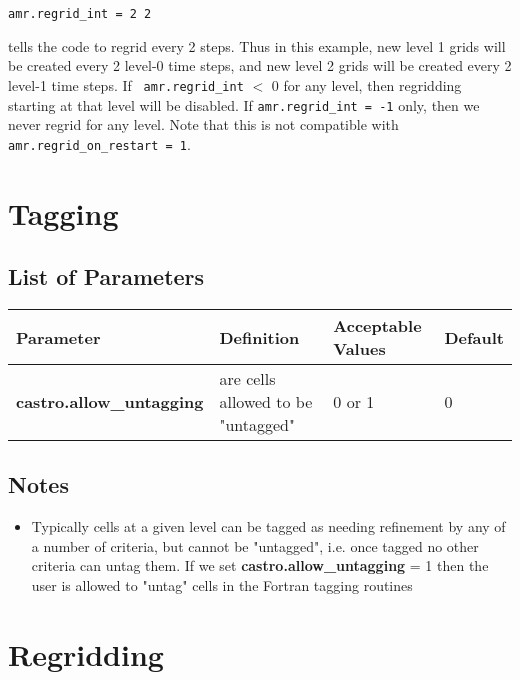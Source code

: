 \begin{lstlisting}
amr.regrid_int = 2 2
\end{lstlisting}
tells the code to regrid every 2 steps.  Thus in this example, new
level 1 grids will be created every 2 level-0 time steps, and new
level 2 grids will be created every 2 level-1 time steps. If {\tt
amr.regrid\_int} $<$ 0 for any level, then regridding starting at that
level will be disabled. If {\tt amr.regrid\_int = -1} only, then we
never regrid for any level. Note that this is not compatible with {\tt
amr.regrid\_on\_restart = 1}.


\section{Tagging}

\subsection{List of Parameters}

\begin{table*}[h]
\begin{scriptsize}
\begin{center}
\begin{tabular}{|l|l|l|l|} \hline
Parameter & Definition & Acceptable Values &Default\\
\hline
{\bf castro.allow\_untagging} & are cells allowed to be "untagged" & 0 or 1 & 0 \\
\hline
\end{tabular}
\label{Table:Tagging}
\end{center}
\end{scriptsize}
\end{table*}

\subsection{Notes}

\begin{itemize}
\item Typically cells at a given level can be tagged as needing refinement by any of a number
of criteria, but cannot be "untagged", i.e. once tagged no other criteria can untag them.   If
we set {\bf castro.allow\_untagging} = 1 then the user is allowed to "untag" cells in the
Fortran tagging routines
\end{itemize}

\section{Regridding}
